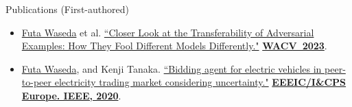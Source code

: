 \documentclass[]{mcdowellcv}
\begin{document}
\begin{cvsection}{Publications (First-authored)}
\begin{cvsubsection}{}{}{}
\begin{itemize}
            \item \ul{Futa Waseda} et al. \href{https://arxiv.org/abs/2112.14337}{``Closer Look at the Transferability of Adversarial Examples: How They Fool Different Models Differently."} \textbf{\href{https://wacv2023.thecvf.com/home}{WACV~2023}}.
            \item \ul{Futa Waseda}, and Kenji Tanaka. \href{https://ieeexplore.ieee.org/document/9160846/}{``Bidding agent for electric vehicles in peer-to-peer electricity trading market considering uncertainty."} \textbf{\href{https://www.eeeic.net/eeeic/}{EEEIC/I\&CPS Europe. IEEE, 2020}}.
        \end{itemize}
    \end{cvsubsection}
\end{cvsection}

\end{document}
